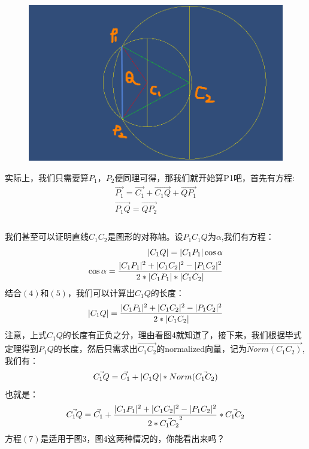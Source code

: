 \documentclass[UTF8,12pt]{article}
\begin{document}
\begin{figure}
	\centering
	\includegraphics[width=0.5\linewidth]{pic3}
	\caption{}
	\label{fig:pic3}
\end{figure}

	实际上，我们只需要算$P_1$，$P_2$便同理可得，那我们就开始算P1吧，首先有方程:
	\begin{eqnarray}
	\vec{P_1} = \vec{C_1}+\vec{C_1Q}+\vec{QP_1}\\
	\vec{P_1Q}=\vec{QP_2}\\
	\end{eqnarray}\\
	我们甚至可以证明直线$C_1C_2$是图形的对称轴。设\angle$P_1C_1Q$为$\alpha$,我们有方程：
	\begin{eqnarray}
	\arrowvert{C_1Q}\arrowvert = \arrowvert{C_1P_1}\arrowvert\cos\alpha\\
	\cos\alpha=\frac{\arrowvert{C_1P_1}\arrowvert^2+\arrowvert{C_1C_2}\arrowvert^2-\arrowvert{P_1C_2}\arrowvert^2}{2*\arrowvert{C_1P_1}\arrowvert*\arrowvert{C_1C_2}\arrowvert} 
	\end{eqnarray}
	结合$(4)$和$(5)$，我们可以计算出$C_1Q$的长度：
	\begin{eqnarray}
		\arrowvert{C_1Q}\arrowvert=\frac{\arrowvert{C_1P_1}\arrowvert^2+\arrowvert{C_1C_2}\arrowvert^2-\arrowvert{P_1C_2}\arrowvert^2}{2*\arrowvert{C_1C_2}\arrowvert} 
	\end{eqnarray}
	注意，上式$C_1Q$的长度有正负之分，理由看图4就知道了，接下来，我们根据毕式定理得到$P_1Q$的长度，然后只需求出$\vec{C_1C_2}$的normalized向量，记为$\vec{Norm(C_1C_2)}$,我们有：
	\begin{eqnarray}
	\vec{C_1Q}=\vec{C_1}+\arrowvert{C_1Q}\arrowvert*Norm(\vec{C_1C_2})
	\end{eqnarray}
	也就是：
	\begin{eqnarray}
	\vec{C_1Q}=\vec{C_1}+\frac{\arrowvert{C_1P_1}\arrowvert^2+\arrowvert{C_1C_2}\arrowvert^2-\arrowvert{P_1C_2}\arrowvert^2}{2*\vec{C_1C_2}^2} *\vec{C_1C_2}
	\end{eqnarray}
	方程$(7)$是适用于图3，图4这两种情况的，你能看出来吗？
\end{document}
